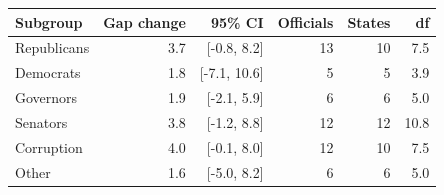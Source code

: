 \begin{tabular}{lrrrrr}
\toprule
Subgroup & Gap change & 95\% CI & Officials & States & df \\
\midrule
Republicans & 3.7 & [-0.8, 8.2] & 13 & 10 & 7.5 \\
Democrats & 1.8 & [-7.1, 10.6] & 5 & 5 & 3.9 \\
Governors & 1.9 & [-2.1, 5.9] & 6 & 6 & 5.0 \\
Senators & 3.8 & [-1.2, 8.8] & 12 & 12 & 10.8 \\
Corruption & 4.0 & [-0.1, 8.0] & 12 & 10 & 7.5 \\
Other & 1.6 & [-5.0, 8.2] & 6 & 6 & 5.0 \\
\bottomrule
\end{tabular}

